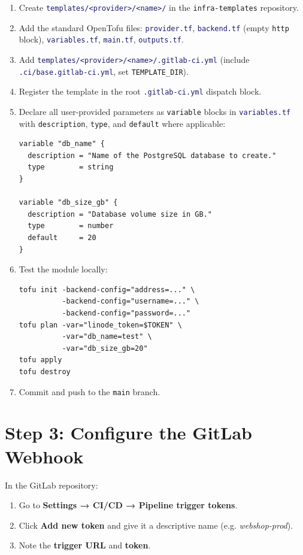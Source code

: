 \documentclass[12pt,a4paper,twoside]{report}
\newcommand{\code}[1]{\texttt{#1}}
\newcommand{\file}[1]{\texttt{\textcolor{MidnightBlue}{#1}}}
\begin{document}
\begin{enumerate}
  \item Create \file{templates/<provider>/<name>/} in the
        \code{infra-templates} repository.
  \item Add the standard OpenTofu files:
        \file{provider.tf}, \file{backend.tf} (empty \code{http} block),
        \file{variables.tf}, \file{main.tf}, \file{outputs.tf}.
  \item Add \file{templates/<provider>/<name>/.gitlab-ci.yml}
        (include \file{.ci/base.gitlab-ci.yml}, set \code{TEMPLATE\_DIR}).
  \item Register the template in the root \file{.gitlab-ci.yml} dispatch block.
  \item Declare all user-provided parameters as \code{variable} blocks
        in \file{variables.tf} with \code{description}, \code{type},
        and \code{default} where applicable:

\begin{lstlisting}[style=hcl]
variable "db_name" {
  description = "Name of the PostgreSQL database to create."
  type        = string
}

variable "db_size_gb" {
  description = "Database volume size in GB."
  type        = number
  default     = 20
}
\end{lstlisting}

  \item Test the module locally:
\begin{lstlisting}[style=bash]
tofu init -backend-config="address=..." \
          -backend-config="username=..." \
          -backend-config="password=..."
tofu plan -var="linode_token=$TOKEN" \
          -var="db_name=test" \
          -var="db_size_gb=20"
tofu apply
tofu destroy
\end{lstlisting}
  \item Commit and push to the \code{main} branch.
\end{enumerate}

\section{Step 3: Configure the GitLab Webhook}

In the GitLab repository:

\begin{enumerate}
  \item Go to \textbf{Settings → CI/CD → Pipeline trigger tokens}.
  \item Click \textbf{Add new token} and give it a descriptive name
        (e.g. \textit{webshop-prod}).
  \item Note the \textbf{trigger URL} and \textbf{token}.
\end{enumerate}
\end{document}
